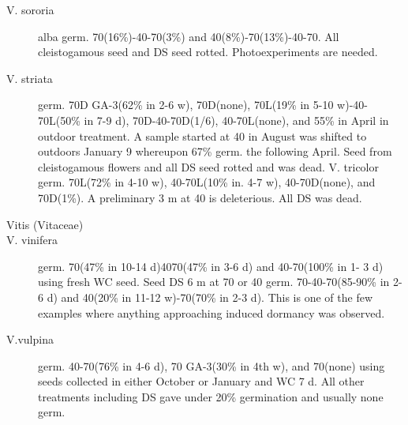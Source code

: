 \begin{description}
\item[V. sororia] alba germ. 70(16\%)-40-70(3\%) and 40(8\%)-70(13\%)-40-70. All
cleistogamous seed and DS seed rotted. Photoexperiments are needed.
\item[V. striata] germ. 70D GA-3(62\% in 2-6 w), 70D(none), 70L(19\% in 5-10 w)-40-
70L(50\% in 7-9 d), 70D-40-70D(1/6), 40-70L(none), and 55\% in April in outdoor
treatment. A sample started at 40 in August was shifted to outdoors January 9
whereupon 67\% germ. the following April. Seed from cleistogamous flowers and all
DS seed rotted and was dead.
V. tricolor germ. 70L(72\% in 4-10 w), 40-70L(10\% in. 4-7 w), 40-70D(none), and
70D(1\%). A preliminary 3 m at 40 is deleterious. All DS was dead.

\item[Vitis (Vitaceae)]
\item[V. vinifera] germ. 70(47\% in 10-14 d)4070(47\% in 3-6 d) and 40-70(100\% in 1-
3 d) using fresh WC seed. Seed DS 6 m at 70 or 40 germ. 70-40-70(85-90\% in 2-6 d)
and 40(20\% in 11-12 w)-70(70\% in 2-3 d). This is one of the few examples where
anything approaching induced dormancy was observed.

\item[V.vulpina] germ. 40-70(76\% in 4-6 d), 70 GA-3(30\% in 4th w), and 70(none)
using seeds collected in either October or January and WC 7 d. All other treatments
including DS gave under 20\% germination and usually none germ.
\end{description}

